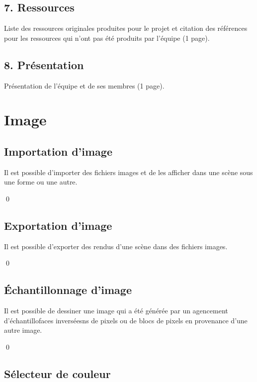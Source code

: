 \documentclass[12pt]{article}
\newcommand{\state}{\noindent}
\begin{document}
\subsection*{7. Ressources}

\state
Liste des ressources originales produites pour le projet et citation des références pour les ressources qui n'ont pas été produits par l'équipe (1 page).

\subsection*{8. Présentation}

\state
Présentation de l'équipe et de ses membres (1 page).

\pagebreak

\section{Image}

\subsection{Importation d'image}

\state
Il est possible d'importer des fichiers images et de les afficher dans une scène sous une forme ou une autre.

\qed

\subsection{Exportation d'image}

\state
Il est possible d'exporter des rendus d'une scène dans des fichiers images.

\qed

\subsection{Échantillonnage d'image}

\state
Il est possible de dessiner une image qui a été générée par un agencement d'échantillofaces inverséesns de pixels ou de blocs de pixels en provenance d'une autre image.

\qed

\subsection{Sélecteur de couleur}
\end{document}
